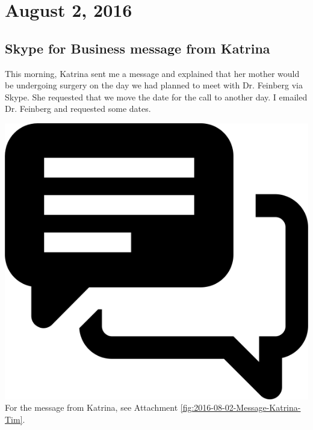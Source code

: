 \documentclass{article}
\begin{document}
\section{August 2, 2016}\label{2016-08-02}
\subsection{Skype for Business message from Katrina}
This morning, Katrina sent me a message and explained that her mother would be undergoing surgery on the day we had planned to meet with Dr. Feinberg via Skype. She requested that we move the date for the call to another day. I emailed Dr. Feinberg and requested some dates. 

\vspace{2em}
\noindent\includegraphics[height=\fontcharht\font`\B]{icons/attachment-message} For the message from Katrina, see Attachment \ref{fig:2016-08-02-Message-Katrina-Tim}.
\vspace{2em}
\end{document}
